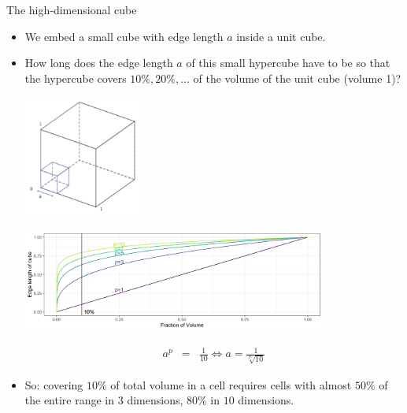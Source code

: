 \begin{vbframe}{The high-dimensional cube}

\begin{itemize}
  \item We embed a small cube with edge length $a$ inside a unit cube.
  \item How long does the edge length $a$ of this small hypercube have to be so that the hypercube covers $10\%, 20\%, ...$ of the volume of the unit cube (volume 1)?

  \medskip
  \begin{center}
    \includegraphics[height = 4cm, width = 4cm]{figure_man/hypercube.png}
  \end{center}

\framebreak

\vspace*{0.1cm}
\begin{center}
\includegraphics[width = 10cm ]{figure/high_dim_cube_plot.png}
\end{center}

\medskip 

  \begin{footnotesize}
  \begin{eqnarray*}
    a^p &=& \frac{1}{10} \Leftrightarrow a = \frac{1}{\sqrt[p]{10}}
  \end{eqnarray*}
  \end{footnotesize}
  \vspace*{-0.5cm}
  \item  So: covering $10\%$ of total volume in a cell requires cells with almost $50\%$ of the entire range in $3$ dimensions, $80\%$ in $10$ dimensions. 
\end{itemize}

\end{vbframe}


